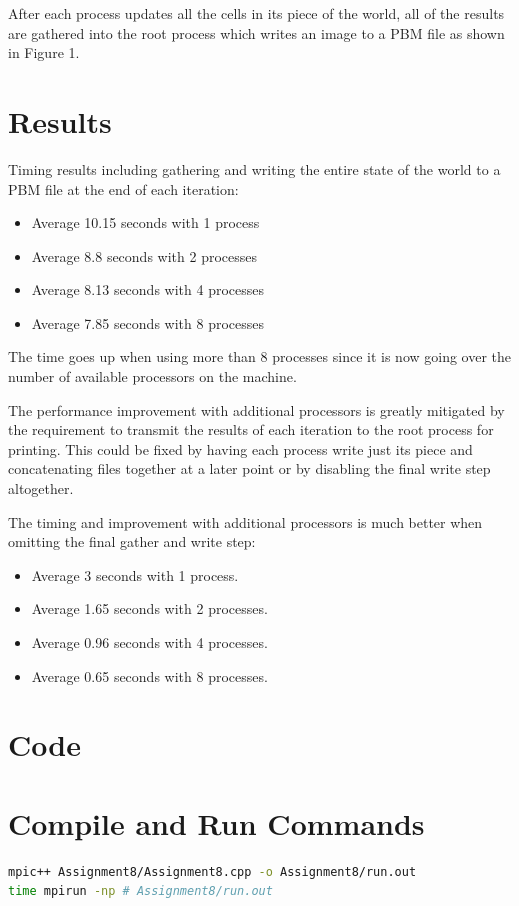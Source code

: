 \documentclass{article}
\begin{document}
After each process updates all the cells in its piece of the world, all of the results are gathered into the root process which writes an image to a PBM file as shown in Figure 1.

\section{Results}
Timing results including gathering and writing the entire state of the world to a PBM file at the end of each iteration:
\begin{itemize}
	\item Average 10.15 seconds with 1 process
	\item Average 8.8 seconds with 2 processes
	\item Average 8.13 seconds with 4 processes
	\item Average 7.85 seconds with 8 processes
\end{itemize}


The time goes up when using more than 8 processes since it is now going over the number of available processors on the machine.

The performance improvement with additional processors is greatly mitigated by the requirement to transmit the results of each iteration to the root process for printing. This could be fixed by having each process write just its piece and concatenating files together at a later point or by disabling the final write step altogether.

The timing and improvement with additional processors is much better when omitting the final gather and write step:
\begin{itemize}
	\item Average 3 seconds with 1 process.
	\item Average 1.65 seconds with 2 processes.
	\item Average 0.96 seconds with 4 processes.
	\item Average 0.65 seconds with 8 processes.
\end{itemize}

\section{Code}



\section{Compile and Run Commands}
\begin{lstlisting}[language=bash]
mpic++ Assignment8/Assignment8.cpp -o Assignment8/run.out
time mpirun -np # Assignment8/run.out
\end{lstlisting}
\end{document}
